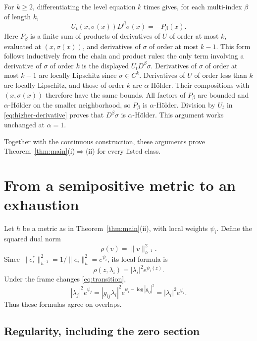 \documentclass[11pt]{amsart}
\theoremstyle{definition}
\theoremstyle{remark}
\numberwithin{equation}{section}
\begin{document}
For $k\ge2$, differentiating the level equation $k$ times gives,
for each multi-index $\beta$ of length $k$,
\begin{equation}\label{eq:higher-derivative}
U_t(x,\sigma(x))D^\beta\sigma(x)=-P_\beta(x).
\end{equation}
Here $P_\beta$ is a finite sum of products of derivatives of $U$ of
order at most $k$, evaluated at $(x,\sigma(x))$, and derivatives of
$\sigma$ of order at most $k-1$. This form follows inductively from
the chain and product rules: the only term involving a derivative of
$\sigma$ of order $k$ is the displayed $U_tD^\beta\sigma$.
Derivatives of $\sigma$ of order at most $k-1$ are locally Lipschitz
since $\sigma\in C^k$. Derivatives of $U$ of order less than $k$ are
locally Lipschitz, and those of order $k$ are $\alpha$-H\"older.
Their compositions with $(x,\sigma(x))$ therefore have the same bounds.
All factors of $P_\beta$ are bounded and $\alpha$-H\"older on the
smaller neighborhood, so $P_\beta$ is $\alpha$-H\"older. Division by
$U_t$ in \eqref{eq:higher-derivative} proves that $D^\beta\sigma$ is
$\alpha$-H\"older. This argument works unchanged at $\alpha=1$.

Together with the continuous construction, these arguments prove
Theorem~\ref{thm:main}(i)$\Rightarrow$(ii) for every listed class.

\section{From a semipositive metric to an exhaustion}

Let $h$ be a metric as in Theorem~\ref{thm:main}(ii), with local
weights $\psi_i$. Define the squared dual norm
\begin{equation}\label{eq:rho}
\rho(v)=\|v\|_{h^{-1}}^2.
\end{equation}
Since $\|e_i^*\|_{h^{-1}}^2=1/\|e_i\|_h^2=e^{\psi_i}$, its local
formula is
\begin{equation}\label{eq:rho-local}
\rho(z,\lambda_i)=|\lambda_i|^2e^{\psi_i(z)}.
\end{equation}
Under the frame changes \eqref{eq:transition},
\[
|\lambda_j|^2e^{\psi_j}
=|g_{ij}\lambda_i|^2e^{\psi_i-\log|g_{ij}|^2}
=|\lambda_i|^2e^{\psi_i}.
\]
Thus these formulas agree on overlaps.

\subsection{Regularity, including the zero section}
\end{document}
